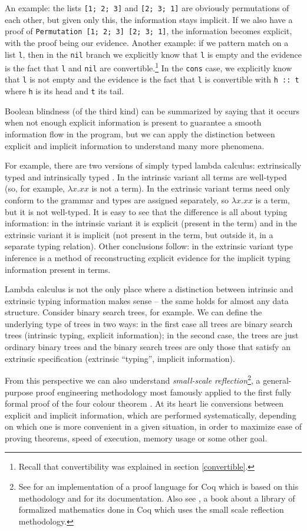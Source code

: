 \documentclass[declaration,mgr,english,shortabstract]{iithesis}
\newcommand{\m}[1]{\texttt{#1}}
\begin{document}
An example: the lists \m{[1; 2; 3]} and \m{[2; 3; 1]} are obviously permutations of each other, but given only this, the information stays implicit. If we also have a proof of \m{Permutation [1; 2; 3] [2; 3; 1]}, the information becomes explicit, with the proof being our evidence. Another example: if we pattern match on a list \m{l}, then in the \m{nil} branch we explicitly know that \m{l} is empty and the evidence is the fact that \m{l} and \m{nil} are convertible.\footnote{Recall that convertibility was explained in section \ref{convertible}.} In the \m{cons} case, we explicitly know that \m{l} is not empty and the evidence is the fact that \m{l} is convertible with \m{h\ ::\ t} where \m{h} is its head and \m{t} its tail.

Boolean blindness (of the third kind) can be summarized by saying that it occurs when not enough explicit information is present to guarantee a smooth information flow in the program, but we can apply the distinction between explicit and implicit information to understand many more phenomena.

For example, there are two versions of simply typed lambda calculus: extrinsically typed and intrinsically typed \cite{IntrinsicExtrinsic}. In the intrinsic variant all terms are well-typed (so, for example, $\lambda x.xx$ is not a term). In the extrinsic variant terms need only conform to the grammar and types are assigned separately, so $\lambda x.xx$ is a term, but it is not well-typed. It is easy to see that the difference is all about typing information: in the intrinsic variant it is explicit (present in the term) and in the extrinsic variant it is implicit (not present in the term, but outside it, in a separate typing relation). Other conclusions follow: in the extrinsic variant type inference is a method of reconstructing explicit evidence for the implicit typing information present in terms.

Lambda calculus is not the only place where a distinction between intrinsic and extrinsic typing information makes sense -- the same holds for almost any data structure. Consider binary search trees, for example. We can define the underlying type of trees in two ways: in the first case all trees are binary search trees (intrinsic typing, explicit information); in the second case, the trees are just ordinary binary trees and the binary search trees are only those that satisfy an extrinsic specification (extrinsic ``typing'', implicit information).

From this perspective we can also understand \textit{small-scale reflection}\footnote{See \cite{SSR1} for an implementation of a proof language for Coq which is based on this methodology and \cite{SSR2} for its documentation. Also see \cite{MCB}, a book about a library of formalized mathematics done in Coq which uses the small scale reflection methodology.}, a general-purpose proof engineering methodology most famously applied to the first fully formal proof of the four colour theorem \cite{4CT1} \cite{4CT2}. At its heart lie conversions between explicit and implicit information, which are performed systematically, depending on which one is more convenient in a given situation, in order to maximize ease of proving theorems, speed of execution, memory usage or some other goal.
\end{document}
